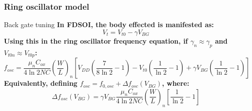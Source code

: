 \documentclass[t, screen, aspectratio=43]{beamer}
\begin{document}
\begin{frame}
	\frametitle{Ring oscillator model}
	\begin{block}{Back gate tuning}
	\scriptsize
		\tiny
		\textbf{In FDSOI, the body effected is manifested as:}
		\begin{equation}
			V_t = V_{t0} - \gamma V_{BG}
		\end{equation}
		\textbf{Using this in the ring oscillator frequency equation, if $\gamma_n \approx \gamma_p$ and $V_{t0n}\approx V_{t0p}$:}
		\begin{equation}
			f_{osc} = \frac{\mu_nC_{ox}}{4\ln2NC}\left(\frac{W}{L}\right)_n\left[V_{DD}\left(\frac{7}{8\ln2}-1\right)-V_{t0}\left(\frac{1}{\ln2}-1\right) + \gamma V_{BG}\left(\frac{1}{\ln2}-1\right) \right]
		\end{equation}
		\textbf{Equivalently, defining $f_{osc} = f_{0,osc} + \Delta f_{osc}(V_{BG})$, where:}
		\begin{equation}
			\Delta f_{osc}(V_{BG}) = \gamma V_{BG}\frac{\mu_nC_{ox}}{4\ln2NC}\left(\frac{W}{L}\right)_n\left[\frac{1}{\ln2}-1\right]
		\end{equation}	
	\end{block}
\end{frame}
\end{document}
